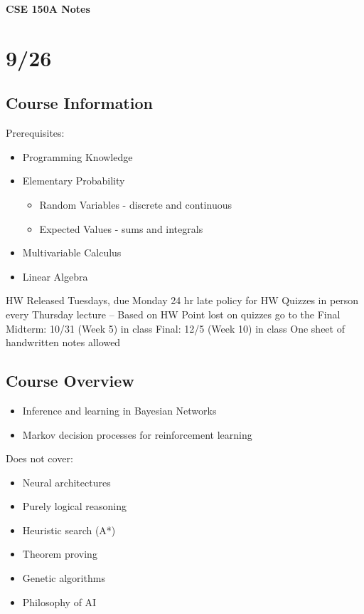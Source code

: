 \documentclass[10pt,letterpaper,unboxed,cm]{article}
\begin{document}
\begin{center}
    \textbf{\Large{CSE 150A Notes}}
\end{center}
\section{9/26}
\subsection{Course Information}
Prerequisites: 
\begin{itemize}
    \item Programming Knowledge
    \item Elementary Probability
    \begin{itemize}
        \item Random Variables - discrete and continuous
        \item Expected Values - sums and integrals
    \end{itemize}
        \item Multivariable Calculus
        \item Linear Algebra
\end{itemize}
HW Released Tuesdays, due Monday
24 hr late policy for HW
Quizzes in person every Thursday lecture -- Based on HW
Point lost on quizzes go to the Final
Midterm: 10/31 (Week 5) in class
Final: 12/5 (Week 10) in class
One sheet of handwritten notes allowed
\subsection{Course Overview}
\begin{itemize}
    \item Inference and learning in Bayesian Networks
    \item Markov decision processes for reinforcement learning
\end{itemize}
Does not cover:
\begin{itemize}
    \item Neural architectures
    \item Purely logical reasoning
    \item Heuristic search (A*)
    \item Theorem proving
    \item Genetic algorithms
    \item Philosophy of AI
\end{itemize}
\end{document}
